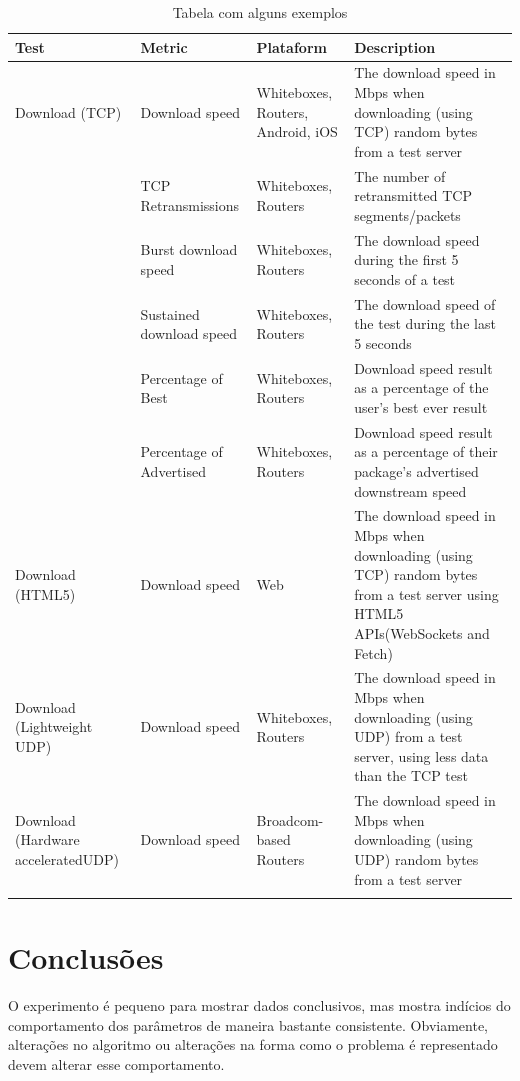 \documentclass{llncs}
\begin{document}
\begin{table}
\centering
\begin{longtable}{p{} p{} p{} p{}}
\label{tbl:2}


\\\textbf{Test} & \textbf{Metric} & \textbf{Plataform} & \textbf{Description}\\
\hline\hline
Download (TCP) & Download speed & Whiteboxes, Routers, Android, iOS & The download speed in Mbps when downloading (using TCP) random bytes from a test server \\ 
\hline 
  & TCP Retransmissions & Whiteboxes, Routers & The number of retransmitted TCP segments/packets \\ 
\hline
  & Burst download speed & Whiteboxes, Routers & The download speed during the first 5 seconds of a test \\ 
\hline 
  & Sustained download speed & Whiteboxes, Routers & The download speed of the test during the last 5 seconds \\ 
\hline 
  & Percentage of Best & Whiteboxes, Routers & Download speed result as a percentage of the user's best ever result \\ 
\hline 
  & Percentage of Advertised & Whiteboxes, Routers & Download speed result as a percentage of their package's advertised downstream speed \\ 
\hline 
Download (HTML5) & Download speed & Web & The download speed in Mbps when downloading (using TCP) random bytes from a test server using HTML5 APIs(WebSockets and Fetch) \\ 
\hline 
Download (Lightweight UDP) & Download speed & Whiteboxes, Routers & The download speed in Mbps when downloading (using UDP) from a test server, using less data than the TCP test \\ 
\hline 
Download (Hardware acceleratedUDP) & Download speed & Broadcom-based Routers & The download speed in Mbps when downloading (using UDP) random bytes from a test server \\
\hline 
\caption{Tabela com alguns exemplos}
\end{longtable}
\end{table}
%
\section{Conclusões}
%
O experimento é pequeno para mostrar dados conclusivos, mas mostra indícios do comportamento dos parâmetros de maneira bastante consistente. Obviamente, alterações no algoritmo ou alterações na forma como o problema é representado devem alterar esse comportamento.
\end{document}
